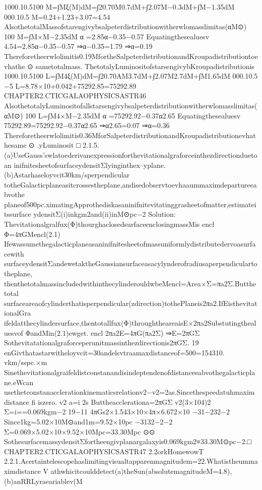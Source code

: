 1000.10.5100
M=∫Mξ(M)dM=∫20.70M0.7dM+∫2.07M−0.3dM+∫M−1.35dM
000.10.5
M=0.24+1.23+3.07=4.54
AlsothetotalMassofstarengivybsalpeterdistributionwitherwlomasslimitas(αM⊙)
100
M=∫M×M−2.35dM
α
=2.85α−0.35−0.57
Equatingthesealuesv
4.54=2.85α−0.35−0.57
⇒α−0.35=1.79
⇒α=0.19
Thereforetheerwlolimitis0.19MfortheSalpeterdistributionandKroupadistributiontoevhathe
⊙
sametotalmass.
ThetotalyLuminositofstarsengivybKroupadistributionis
1000.10.5100
L=∫M4ξ(M)dM=∫20.70AM3.7dM+∫2.07M2.7dM+∫M1.65dM
000.10.5
−5
L=8.78×10+0.042+75292.85=75292.89
CHAPTER2.CTICGALAOPHYSICSASTR46
AlsothetotalyLuminositofallstarsengivybsalpeterdistributionwitherwlomasslimitas(αM⊙)
100
L=∫M4×M−2.35dM
α
=75292.92−0.37α2.65
Equatingthesealuesv
75292.89=75292.92−0.37α2.65
⇒α2.65=0.07
⇒α=0.36
Thereforetheerwlolimitis0.36MforSalpeterdistributionandKroupadistributionevhathesame
⊙
.yLuminosit
□
2.1.5.(a)UseGauss’swlatoederivanexpressionforthevitationalgraforceinthezdirectionduetoan
inifnitesheetofsurfaceydensitΣlyinginthex–yplane.(b)Astarhaseloyvcit30km/sperpendicular
totheGalacticplaneasitcrossestheplane,andisedobservtoevhaaummaximdepartureeabvothe
planeof500pc.ximatingApprothediskasaninifnitevitatinggrasheetofmatter,estimateitssurface
ydensitΣ(i)inkgm2and(ii)inM⊙pc−2
Solution:
Thevitationalgralfux(Φ)thourghaclosedsurfaceenclosingmassMis
encl
Φ=4πGMencl(2.1)
Ifewassumethegalacticplaneasaninifnitesheetofmassuniformlydistributedervoasurfacewith
surfaceydensitΣandewetaktheGaussiansurfaceasacylynderofradiusaperpendiculartotheplane,
thenthetotalmassincludedwithinthecylinderouldwbeMencl=Area×Σ=πa2Σ.Butthetotal
surfaceareaofcylinderthatisperpendicular(zdirection)tothePlaneis2πa2.IfEisthevitationalGra
ifeldatthecylindersurface,thentotallfux(Φ)throughtheareaisE×2πa2Substutingthealuesvof
ΦandMin(2.1)ewget.
encl
2πa2E=4πG(πa2Σ)
⇒E=2πGΣ
Sothevitatationalgraforceperunitmassinthezdirectionis2πGΣ.
19
enGivthatastarwitheloyvcit=30andelsvtraamaxdistanceof=500=154310.
vkm/sspc.×m
Sinethevitationalgraifeldistconstanandisindeptendenofdistanceeabvothegalacticplane.eWcan
usethetconstanacclerationkinematicsrelationv2−v2=2as.Sincethespeedatuhmaximdistance
fi
iszero.
v2
a=i
2s
Buttheacclerationa=2πGΣ
v2(3×104)2
Σ=i==0.069kgm−2
19−11
4πGs2×1.543×10×4π×6.672×10
−31−232−2
Since1kg=5.02×10M⊙and1m=9.52×10pc
−3132−2−2
Σ=0.069×5.02×10×9.52×10Mpc=33.30Mpc
⊙⊙
SothesurfacemassydensitΣfortheengivplanargalaxyis0.069kgm2≡33.30M⊙pc−2.□
CHAPTER2.CTICGALAOPHYSICSASTR47
2.2orkHomewowT
2.2.1.Acertaintelescopehaslimitingvisualtapparenmagnitudem=22.Whatistheummaximdistance
V
athwhicitcoulddetect(a)theSun(absolutemagnitudeM=4.8),(b)anRRLyraeariablev(M
